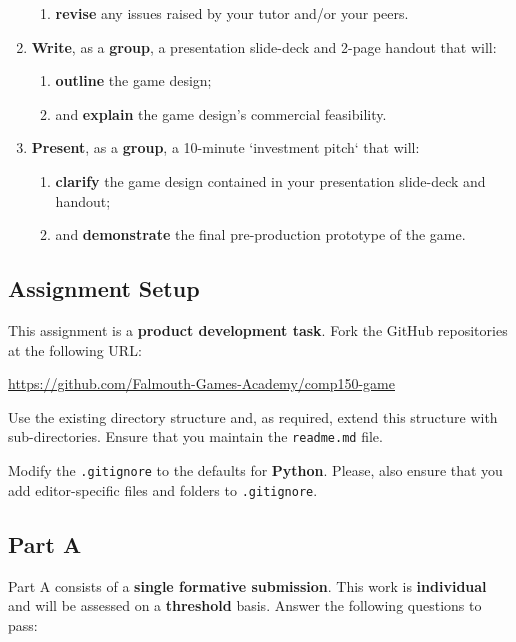 \documentclass{../../fal_assignment}
\begin{document}
\begin{enumerate}[label=(\Alph*)]
\begin{enumerate}[label=\roman*.]
    		\item \textbf{revise} any issues raised by your tutor and/or your peers.
	\end{enumerate}
    \item \textbf{Write}, as a \textbf{group}, a presentation slide-deck and 2-page handout that will:
    	\begin{enumerate}[label=\roman*.]
    		\item \textbf{outline} the game design;
    		\item and \textbf{explain} the game design's commercial feasibility.
	\end{enumerate}
    \item \textbf{Present}, as a \textbf{group}, a 10-minute `investment pitch` that will:
    	\begin{enumerate}[label=\roman*.]
    		\item \textbf{clarify} the game design contained in your presentation slide-deck and handout;
    		\item and \textbf{demonstrate} the final pre-production prototype of the game.
	\end{enumerate}
\end{enumerate}

\subsection*{Assignment Setup}

This assignment is a \textbf{product development task}. Fork the GitHub repositories at the following URL:

\indent \url{https://github.com/Falmouth-Games-Academy/comp150-game}

Use the existing directory structure and, as required, extend this structure with sub-directories. Ensure that you maintain the \texttt{readme.md} file.

Modify the \texttt{.gitignore} to the defaults for \textbf{Python}. Please, also ensure that you add editor-specific files and folders to \texttt{.gitignore}. 

\subsection*{Part A}

Part A consists of a \textbf{single formative submission}. This work is \textbf{individual} and will be assessed on a \textbf{threshold} basis. Answer the following questions to pass:
\end{document}
